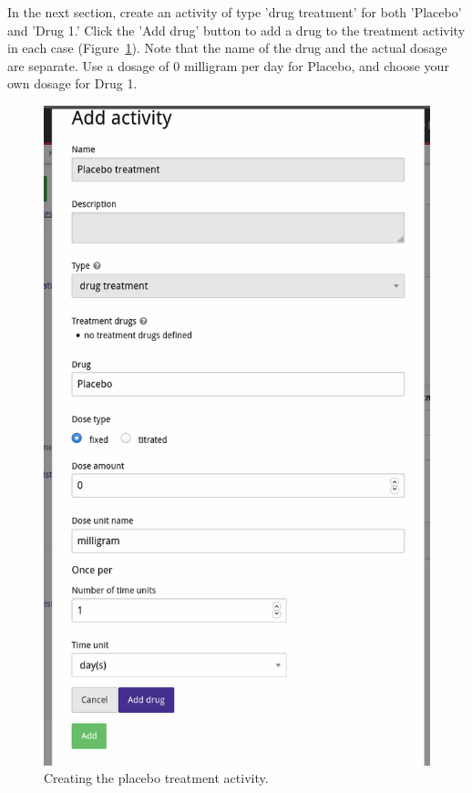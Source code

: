 \documentclass[12pt]{article}
\begin{document}
In the next section, create an activity of type 'drug treatment' for both 'Placebo' and 'Drug 1.' Click the 'Add drug' button to add a drug to the treatment activity in each case (Figure~\ref{fig:addPlaceboTreatment}). Note that the name of the drug and the actual dosage are separate. Use a dosage of 0 milligram per day for Placebo, and choose your own dosage for Drug 1.

\begin{figure}[!htbp]
  \centering
  \includegraphics[width=\textwidth]{img/addPlaceboTreatment.png}
  \caption{Creating the placebo treatment activity.}
\label{fig:addPlaceboTreatment}
\end{figure}
\end{document}
